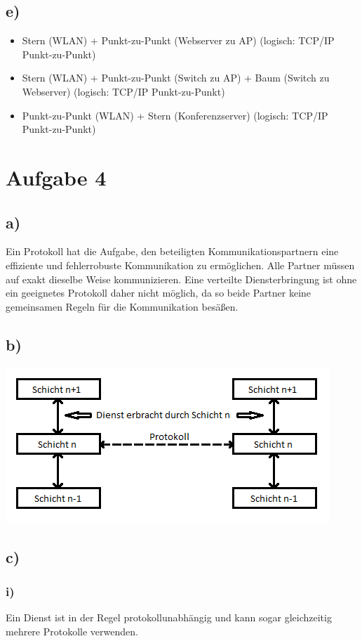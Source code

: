 \documentclass[a4paper,12pt]{scrartcl}
\begin{document}
\subsection{e)}
\begin{itemize}
	\item Stern (WLAN) + Punkt-zu-Punkt (Webserver zu AP) (logisch: TCP/IP Punkt-zu-Punkt)
	\item Stern (WLAN) + Punkt-zu-Punkt (Switch zu AP) + Baum (Switch zu Webserver) (logisch: TCP/IP Punkt-zu-Punkt)
	\item Punkt-zu-Punkt (WLAN) + Stern (Konferenzserver) (logisch: TCP/IP Punkt-zu-Punkt)
\end{itemize}

\section{Aufgabe 4}
\subsection{a)}
Ein Protokoll hat die Aufgabe, den beteiligten Kommunikationspartnern eine
effiziente und fehlerrobuste Kommunikation zu ermöglichen. Alle Partner müssen
auf exakt dieselbe Weise kommunizieren.
Eine verteilte Diensterbringung ist ohne ein geeignetes Protokoll daher nicht möglich, da so beide Partner keine gemeinsamen Regeln für die Kommunikation besäßen.

\subsection{b)}
\includegraphics{./images/Blatt-1_Aufgabe4b}
\subsection{c)}
\subsubsection{i)}
Ein Dienst ist in der Regel protokollunabhängig und kann sogar gleichzeitig
mehrere Protokolle verwenden.
\end{document}
